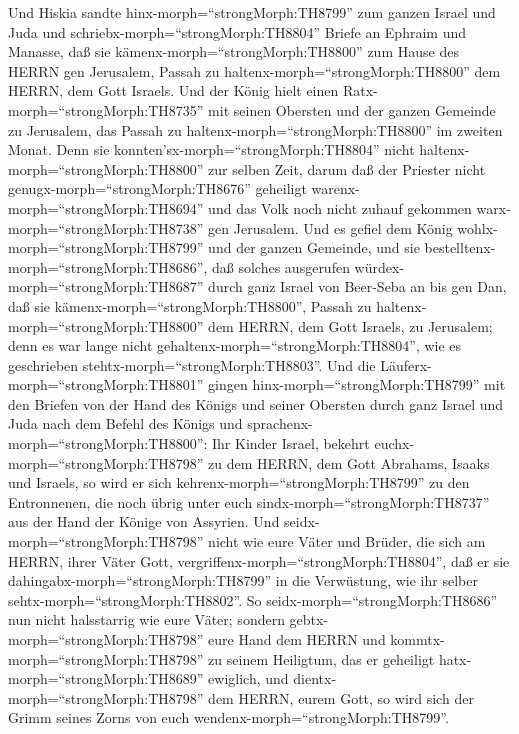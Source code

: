  Und Hiskia sandte hinx-morph=``strongMorph:TH8799'' zum
ganzen Israel und Juda und schriebx-morph=``strongMorph:TH8804'' Briefe
an Ephraim und Manasse, daß sie kämenx-morph=``strongMorph:TH8800'' zum
Hause des HERRN gen Jerusalem, Passah zu
haltenx-morph=``strongMorph:TH8800'' dem HERRN, dem Gott Israels.
 Und der König hielt einen Ratx-morph=``strongMorph:TH8735''
mit seinen Obersten und der ganzen Gemeinde zu Jerusalem, das Passah zu
haltenx-morph=``strongMorph:TH8800'' im zweiten Monat.  Denn
sie konnten'sx-morph=``strongMorph:TH8804'' nicht
haltenx-morph=``strongMorph:TH8800'' zur selben Zeit, darum daß der
Priester nicht genugx-morph=``strongMorph:TH8676'' geheiligt
warenx-morph=``strongMorph:TH8694'' und das Volk noch nicht zuhauf
gekommen warx-morph=``strongMorph:TH8738'' gen Jerusalem. 
Und es gefiel dem König wohlx-morph=``strongMorph:TH8799'' und der
ganzen Gemeinde,  und sie
bestelltenx-morph=``strongMorph:TH8686'', daß solches ausgerufen
würdex-morph=``strongMorph:TH8687'' durch ganz Israel von Beer-Seba an
bis gen Dan, daß sie kämenx-morph=``strongMorph:TH8800'', Passah zu
haltenx-morph=``strongMorph:TH8800'' dem HERRN, dem Gott Israels, zu
Jerusalem; denn es war lange nicht
gehaltenx-morph=``strongMorph:TH8804'', wie es geschrieben
stehtx-morph=``strongMorph:TH8803''.  Und die
Läuferx-morph=``strongMorph:TH8801'' gingen
hinx-morph=``strongMorph:TH8799'' mit den Briefen von der Hand des
Königs und seiner Obersten durch ganz Israel und Juda nach dem Befehl
des Königs und sprachenx-morph=``strongMorph:TH8800'': Ihr Kinder
Israel, bekehrt euchx-morph=``strongMorph:TH8798'' zu dem HERRN, dem
Gott Abrahams, Isaaks und Israels, so wird er sich
kehrenx-morph=``strongMorph:TH8799'' zu den Entronnenen, die noch übrig
unter euch sindx-morph=``strongMorph:TH8737'' aus der Hand der Könige
von Assyrien.  Und seidx-morph=``strongMorph:TH8798'' nicht
wie eure Väter und Brüder, die sich am HERRN, ihrer Väter Gott,
vergriffenx-morph=``strongMorph:TH8804'', daß er sie
dahingabx-morph=``strongMorph:TH8799'' in die Verwüstung, wie ihr selber
sehtx-morph=``strongMorph:TH8802''.  So
seidx-morph=``strongMorph:TH8686'' nun nicht halsstarrig wie eure Väter;
sondern gebtx-morph=``strongMorph:TH8798'' eure Hand dem HERRN und
kommtx-morph=``strongMorph:TH8798'' zu seinem Heiligtum, das er
geheiligt hatx-morph=``strongMorph:TH8689'' ewiglich, und
dientx-morph=``strongMorph:TH8798'' dem HERRN, eurem Gott, so wird sich
der Grimm seines Zorns von euch wendenx-morph=``strongMorph:TH8799''.
